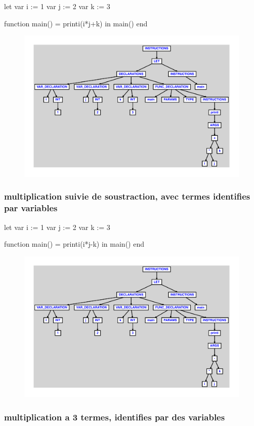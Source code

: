 \documentclass{article}
\begin{document}
\begin{verbatimtab}
let
	var i := 1
	var j := 2
	var k := 3

	function main() = printi(i*j+k)
in main() end
\end{verbatimtab}
\begin{figure}[H]\centering\includegraphics[max width=\textwidth]{ast/ast_59.pdf}\end{figure}\subsubsection{multiplication suivie de soustraction, avec termes identifies par variables}
\begin{verbatimtab}
let
	var i := 1
	var j := 2
	var k := 3

	function main() = printi(i*j-k)
in main() end
\end{verbatimtab}
\begin{figure}[H]\centering\includegraphics[max width=\textwidth]{ast/ast_60.pdf}\end{figure}\subsubsection{multiplication a 3 termes, identifies par des variables}
\end{document}
